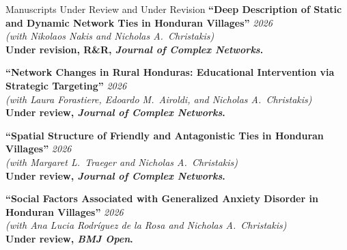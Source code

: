 \documentclass{resume}
\newcommand{\pubtitle}[1]{\textbf{``#1''}}
\begin{document}
\begin{rSection}{Manuscripts Under Review and Under Revision}
\pubtitle{Deep Description of Static and Dynamic Network Ties in Honduran Villages} \hfill {\em 2026}\\
\textit{(with Nikolaos Nakis and Nicholas A.\ Christakis)}\\
{\small \textbf{Under revision, R\&R, \emph{Journal of Complex Networks}.}}

\pubtitle{Network Changes in Rural Honduras: Educational Intervention via Strategic Targeting} \hfill {\em 2026}\\
\textit{(with Laura Forastiere, Edoardo M.\ Airoldi, and Nicholas A.\ Christakis)}\\
{\small \textbf{Under review, \emph{Journal of Complex Networks}.}}

\pubtitle{Spatial Structure of Friendly and Antagonistic Ties in Honduran Villages} \hfill {\em 2026}\\
\textit{(with Margaret L.\ Traeger and Nicholas A.\ Christakis)}\\
{\small \textbf{Under review, \emph{Journal of Complex Networks}.}}

\pubtitle{Social Factors Associated with Generalized Anxiety Disorder in Honduran Villages} \hfill {\em 2026}\\
\textit{(with Ana Lucia Rodr\'iguez de la Rosa and Nicholas A.\ Christakis)}\\
{\small \textbf{Under review, \emph{BMJ Open}.}}

\end{rSection}
\end{document}
